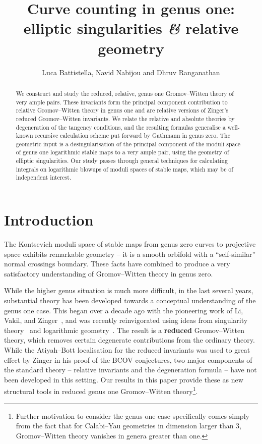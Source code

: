\documentclass[11pt]{amsart}
\title[Curve counting in genus one: elliptic singularities {\it \&}  relative geometry]{Curve counting in genus one: elliptic singularities {\it \&} relative geometry}
\author{Luca Battistella, Navid Nabijou and Dhruv Ranganathan}
\date{\thismonthyear}
\theoremstyle{definition}
\theoremstyle{definition}
\begin{document}
\begin{abstract}
We construct and study the reduced, relative, genus one Gromov--Witten theory of very ample pairs. These invariants form the principal component contribution to relative Gromov--Witten theory in genus one and are relative versions of Zinger's reduced Gromov--Witten invariants. We relate the relative and absolute theories by degeneration of the tangency conditions, and the resulting formulas generalise a well-known recursive calculation scheme put forward by Gathmann in genus zero. The geometric input is a desingularisation of the principal component of the moduli space of genus one logarithmic stable maps to a very ample pair, using the geometry of elliptic singularities. Our study passes through general techniques for calculating integrals on logarithmic blowups of moduli spaces of stable maps, which may be of independent interest.
\end{abstract}

\maketitle

\appendixtitletocoff
\tableofcontents

\setcounter{section}{-1}
\section{Introduction}

The Kontsevich moduli space of stable maps from genus zero curves to projective space exhibits remarkable geometry -- it is a smooth orbifold with a ``self-similar'' normal crossings boundary. These facts have combined to produce a very {satisfactory} understanding of Gromov--Witten theory in genus zero. 

While the higher genus situation is much more difficult, in the last several years, substantial theory has been developed towards a conceptual understanding of the genus one case. This began over a decade ago with the pioneering work of Li, Vakil, and Zinger~\cite{redgone,VZ,LZ,lz2,zingerstvsred,zingred}, and was recently reinvigorated using ideas from singularity theory~\cite{BCM18,CM18,HL,SMY1,VISC} and logarithmic geometry~\cite{RSPW,RSPW2}. The result is a \textbf{reduced} Gromov--Witten theory, which removes certain degenerate contributions from the ordinary theory. While the Atiyah--Bott localisation for the reduced invariants was used to great effect by Zinger in his proof of the BCOV conjectures, two major components of the standard theory -- relative invariants and the degeneration formula -- have not been developed in this setting. Our results in this paper provide these as new {structural} tools in reduced genus one Gromov--Witten theory\footnote{Further motivation to consider the genus one case specifically comes simply from the fact that for Calabi--Yau geometries in dimension larger than $3$, Gromov--Witten theory vanishes in genera greater than one.}. 
\end{document}
